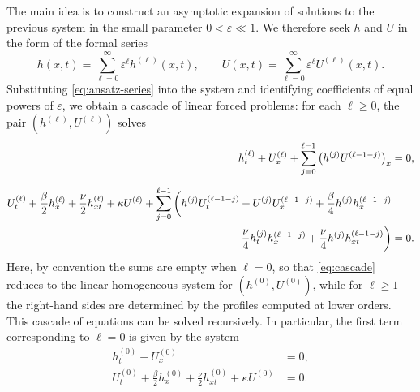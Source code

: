 \documentclass[reqno]{amsart}
\theoremstyle{definition}
\numberwithin{equation}{section}
\numberwithin{theorem}{section}
\numberwithin{definition}{section}
\begin{document}
The main idea is to construct an asymptotic expansion of solutions to the previous system in the small parameter
$0<\varepsilon\ll1$. We therefore seek $h$ and $U$ in the form of the formal series
\begin{equation}\label{eq:ansatz-series}
	h(x,t)= \sum_{\ell=0}^{\infty} \varepsilon^\ell h^{(\ell)}(x,t),
	\qquad
	U(x,t) = \sum_{\ell=0}^{\infty} \varepsilon^{\ell}U^{(\ell)}(x,t).
\end{equation}
Substituting \eqref{eq:ansatz-series} into the system and identifying coefficients of equal powers of $\varepsilon$,
we obtain a cascade of linear forced problems: for each $\ell\ge 0$, the pair $(h^{(\ell)},U^{(\ell)})$ solves
\begin{subequations}\label{eq:cascade}
	\begin{align}
		h_t^{(\ell)} + U_x^{(\ell)}
		+ \sum_{j=0}^{\ell-1}\big(h^{(j)}U^{(\ell-1-j)}\big)_x
		&=0,\label{eq:cascade-mass}\\[0.2cm]
		U_t^{(\ell)}+  \frac{\beta}{2} h_x^{(\ell)}+\frac{\nu}{2} h_{xt}^{(\ell)}+\kappa U^{(\ell)}
		+ \sum_{j=0}^{\ell-1}\bigg(
		h^{(j)} U_t^{(\ell-1-j)}+ U^{(j)}U_x^{(\ell-1-j)}
		+\frac{\beta}{4}  h^{(j)}h_x^{(\ell-1-j)}
		&\nonumber\\
		\hspace{4.2cm}
		-\frac{\nu}{4}h_t^{(j)}h_x^{(\ell-1-j)}
		+\frac{\nu}{4}h^{(j)}h_{xt}^{(\ell-1-j)}
		\bigg)
		&=0.\label{eq:cascade-mom}
	\end{align}
\end{subequations}
Here, by convention the sums are empty when $\ell=0$, so that \eqref{eq:cascade} reduces to the linear homogeneous
system for $(h^{(0)},U^{(0)})$, while for $\ell\ge1$ the right-hand sides are determined by the profiles computed at
lower orders. This cascade of equations can be solved recursively. In particular, the first term corresponding to $\ell=0$ is given by the system
\begin{subequations}\label{sistema_2.11}
	\begin{align}
		h^{(0)}_t + U^{(0)}_x  &= 0, \label{sistema_2.11a} \\
		U^{(0)}_t + \frac{\beta}{2} h^{(0)}_x+\frac{\nu}{2}h^{(0)}_{xt} + \kappa U^{(0)}&=0. \label{sistema_2.11b}
	\end{align}
\end{subequations}
\end{document}
